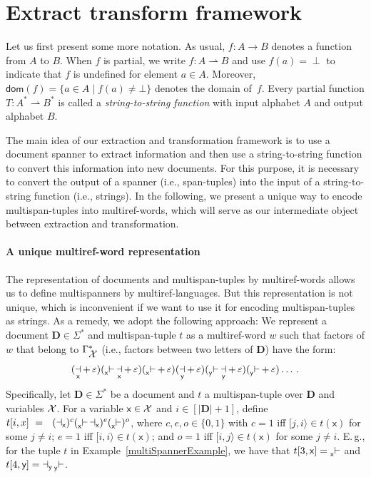 \documentclass[
a4paper
]{article}
\theoremstyle{plain}
\theoremstyle{definition}
\theoremstyle{remark}
\DeclareMathOperator{\eword}{\varepsilon}
\newcommand{\varset}{\mbox{\ensuremath{\mathcal{X}}}}
\DeclareMathOperator{\openmark}{\vdash}
\DeclareMathOperator{\closemark}{\dashv}
\newcommand{\doc}{\ensuremath{\mathbf{D}}}
\newcommand{\spann}[2]{\ensuremath{[#1,#2\rangle}}
\newcommand{\open}[1]{\prescript{}{#1}{\openmark}}
\newcommand{\close}[1]{\closemark_{#1}}
\newcommand{\varsx}{\ensuremath{\textsf{x}}}
\newcommand{\varsy}{\ensuremath{\textsf{y}}}
\DeclareMathOperator{\altop}{+}
\newcommand{\dom}{\operatorname{dom}}
\newcommand{\pmap}{\rightharpoonup}
\DeclareMathOperator{\nondef}{\bot}
\renewcommand{\operatorname}[1]{\textsf{#1}}
\begin{document}
 	
\section{Extract transform  framework}\label{sec:framework}
	
Let us first present some more notation. As usual, $f: A \to B$ denotes a function from $A$ to $B$. When $f$ is partial, we write $f: A \pmap B$ and use $f(a) = \nondef$ to indicate that $f$ is undefined for element $a \in A$. Moreover, $\dom(f) = \{a \in A \mid f(a) \neq \bot\}$ denotes the domain of~$f$. Every partial function $T : A^* \pmap B^*$ is called a \emph{string-to-string function} with input alphabet $A$ and output alphabet $B$.

The main idea
of our extraction and transformation framework is to use
a document spanner
to extract information
and then use a string-to-string function to convert this information into new documents.
For this purpose, it is necessary to convert the output of a spanner (i.e., span-tuples) into the input of a
string-to-string function
(i.e., strings). In the following, we present
a unique way
to encode multispan-tuples into multiref-words, which will serve as our intermediate object between extraction and transformation.

\paragraph{A unique multiref-word representation} The representation of documents and multispan-tuples by multiref-words allows us to define multispanners by multiref-languages.
But this
representation is not unique, which is inconvenient if we want to use it for
encoding
multispan-tuples as strings.
As a remedy, we adopt the following approach: We
represent a document $\doc \in \Sigma^*$ and multispan-tuple $t$ as a
multiref-word $w$ such that factors of $w$ 
that belong to $\Gamma_{\varset}^*$ (i.e., factors between two letters of $\doc$)
have the form:
\begin{equation*}
	(\close{\varsx} \altop \eword) (\open{\varsx} \close{\varsx} \altop \eword) (\open{\varsx} \altop \eword) (\close{\varsy} \altop \eword) (\open{\varsy} \close{\varsy} \altop \eword) (\open{\varsy} \altop \eword) \ldots\,.
\end{equation*}
Specifically, let $\doc \in \Sigma^*$ be a document and $t$ a multispan-tuple over $\doc$ and variables $\varset$. For a variable $\varsx \in \varset$ and $i \in [|\doc| +1]$, define $t[i,x] \ = \ \ (\close{\varsx})^c (\open{\varsx} \close{\varsx})^e (\open{\varsx})^o$,
where $c, e, o \in \{0,1\}$
with $c = 1$ iff $\spann{j}{i} \in t(\varsx)$ for some $j \neq i$; $e = 1$ iff $\spann{i}{i} \in t(\varsx)$; and $o = 1$ iff $\spann{i}{j} \in t(\varsx)$ for some $j \neq i$. 
E.\,g., for the tuple $t$ in Example~\ref{multiSpannerExample}, we have that $t[3,\varsx] = \open{\varsx}$ and $t[4,\varsy] = \close{\varsy} \open{\varsy}$. 
\end{document}

